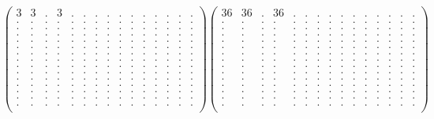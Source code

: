 \documentclass[12pt,a4paper]{amsart}
\begin{document}
\begin{align*}
\left(\begin{array}{rrrrrrrrrrrrrrr}%
3&3&.&3&.&.&.&.&.&.&.&.&.&.&.\\%
.&.&.&.&.&.&.&.&.&.&.&.&.&.&.\\%
.&.&.&.&.&.&.&.&.&.&.&.&.&.&.\\%
.&.&.&.&.&.&.&.&.&.&.&.&.&.&.\\%
.&.&.&.&.&.&.&.&.&.&.&.&.&.&.\\%
.&.&.&.&.&.&.&.&.&.&.&.&.&.&.\\%
.&.&.&.&.&.&.&.&.&.&.&.&.&.&.\\%
.&.&.&.&.&.&.&.&.&.&.&.&.&.&.\\%
.&.&.&.&.&.&.&.&.&.&.&.&.&.&.\\%
.&.&.&.&.&.&.&.&.&.&.&.&.&.&.\\%
.&.&.&.&.&.&.&.&.&.&.&.&.&.&.\\%
.&.&.&.&.&.&.&.&.&.&.&.&.&.&.\\%
.&.&.&.&.&.&.&.&.&.&.&.&.&.&.\\%
.&.&.&.&.&.&.&.&.&.&.&.&.&.&.\\%
.&.&.&.&.&.&.&.&.&.&.&.&.&.&.\\%
\end{array}\right)%
\left(\begin{array}{rrrrrrrrrrrrrrr}%
36&36&.&36&.&.&.&.&.&.&.&.&.&.&.\\%
.&.&.&.&.&.&.&.&.&.&.&.&.&.&.\\%
.&.&.&.&.&.&.&.&.&.&.&.&.&.&.\\%
.&.&.&.&.&.&.&.&.&.&.&.&.&.&.\\%
.&.&.&.&.&.&.&.&.&.&.&.&.&.&.\\%
.&.&.&.&.&.&.&.&.&.&.&.&.&.&.\\%
.&.&.&.&.&.&.&.&.&.&.&.&.&.&.\\%
.&.&.&.&.&.&.&.&.&.&.&.&.&.&.\\%
.&.&.&.&.&.&.&.&.&.&.&.&.&.&.\\%
.&.&.&.&.&.&.&.&.&.&.&.&.&.&.\\%
.&.&.&.&.&.&.&.&.&.&.&.&.&.&.\\%
.&.&.&.&.&.&.&.&.&.&.&.&.&.&.\\%
.&.&.&.&.&.&.&.&.&.&.&.&.&.&.\\%
.&.&.&.&.&.&.&.&.&.&.&.&.&.&.\\%
.&.&.&.&.&.&.&.&.&.&.&.&.&.&.\\%
\end{array}\right)%
\end{align*}
\end{document}
